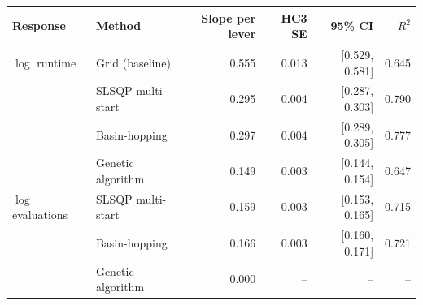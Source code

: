 \begin{tabular}{llrrrr}
\toprule
Response & Method & Slope per lever & HC3 SE & 95\% CI & $R^2$ \\
\midrule
$\log$ runtime & Grid (baseline) & 0.555 & 0.013 & [0.529, 0.581] & 0.645 \\
 & SLSQP multi-start & 0.295 & 0.004 & [0.287, 0.303] & 0.790 \\
 & Basin-hopping & 0.297 & 0.004 & [0.289, 0.305] & 0.777 \\
 & Genetic algorithm & 0.149 & 0.003 & [0.144, 0.154] & 0.647 \\
\addlinespace
$\log$ evaluations & SLSQP multi-start & 0.159 & 0.003 & [0.153, 0.165] & 0.715 \\
 & Basin-hopping & 0.166 & 0.003 & [0.160, 0.171] & 0.721 \\
 & Genetic algorithm & 0.000 & -- & -- & -- \\
\bottomrule
\end{tabular}